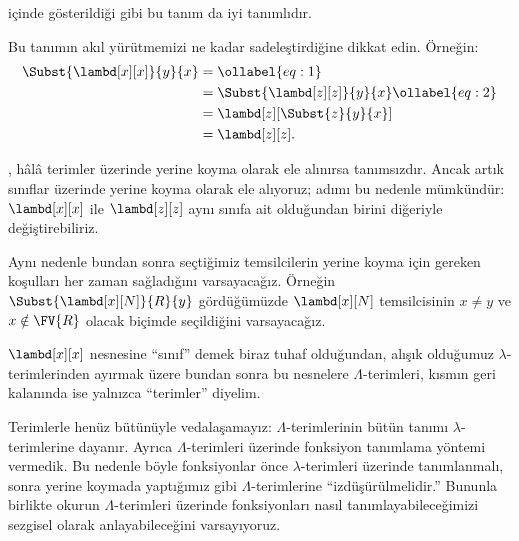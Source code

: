  içinde gösterildiği gibi bu tanım da iyi tanımlıdır.

Bu tanımın akıl yürütmemizi ne kadar sadeleştirdiğine dikkat edin. Örneğin:
\begin{align}
  \Subst{\lambd[x][x]}{y}{x} & =\ollabel{eq:1}\\
  &= \Subst{\lambd[z][z]}{y}{x} \ollabel{eq:2}\\
  &= \lambd[z][\Subst{z}{y}{x}] \\
  &= \lambd[z][z].
\end{align}

, hâlâ terimler üzerinde yerine koyma olarak ele alınırsa
tanımsızdır. Ancak artık sınıflar üzerinde yerine koyma olarak ele alıyoruz;
 adımı bu nedenle mümkündür: $\lambd[x][x]$ ile
$\lambd[z][z]$ aynı sınıfa ait olduğundan birini diğeriyle değiştirebiliriz.

Aynı nedenle bundan sonra seçtiğimiz temsilcilerin yerine koyma için gereken
koşulları her zaman sağladığını varsayacağız. Örneğin
$\Subst{\lambd[x][N]}{R}{y}$ gördüğümüzde $\lambd[x][N]$ temsilcisinin
$x\neq y$ ve $x\notin\FV{R}$ olacak biçimde seçildiğini varsayacağız.

$\lambd[x][x]$ nesnesine ``sınıf'' demek biraz tuhaf olduğundan, alışık
olduğumuz $\lambda$-terimlerinden ayırmak üzere bundan sonra bu nesnelere
$\Lambda$-terimleri, kısmın geri kalanında ise yalnızca ``terimler'' diyelim.

\begin{editorial}
  Terimlerle henüz bütünüyle vedalaşamayız: $\Lambda$-terimlerinin bütün
  tanımı $\lambda$-terimlerine dayanır. Ayrıca $\Lambda$-terimleri üzerinde
  fonksiyon tanımlama yöntemi vermedik. Bu nedenle böyle fonksiyonlar önce
  $\lambda$-terimleri üzerinde tanımlanmalı, sonra yerine koymada yaptığımız
  gibi $\Lambda$-terimlerine ``izdüşürülmelidir.'' Bununla birlikte okurun
  $\Lambda$-terimleri üzerinde fonksiyonları nasıl tanımlayabileceğimizi
  sezgisel olarak anlayabileceğini varsayıyoruz.
\end{editorial}
